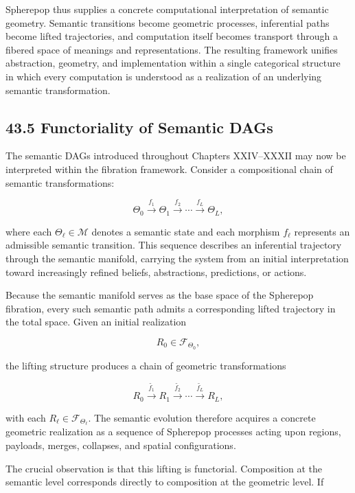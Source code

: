 \documentclass[12pt,letterpaper]{article}
\theoremstyle{remark}
\begin{document}
Spherepop thus supplies a concrete computational interpretation of semantic geometry. Semantic transitions become geometric processes, inferential paths become lifted trajectories, and computation itself becomes transport through a fibered space of meanings and representations. The resulting framework unifies abstraction, geometry, and implementation within a single categorical structure in which every computation is understood as a realization of an underlying semantic transformation.

\subsection{43.5 Functoriality of Semantic DAGs}

The semantic DAGs introduced throughout Chapters XXIV--XXXII may now be interpreted within the fibration framework. Consider a compositional chain of semantic transformations:

\[
\Theta_0
\xrightarrow{f_1}
\Theta_1
\xrightarrow{f_2}
\cdots
\xrightarrow{f_L}
\Theta_L,
\]

where each $\Theta_\ell \in \mathcal{M}$ denotes a semantic state and each morphism $f_\ell$ represents an admissible semantic transition. This sequence describes an inferential trajectory through the semantic manifold, carrying the system from an initial interpretation toward increasingly refined beliefs, abstractions, predictions, or actions.

Because the semantic manifold serves as the base space of the Spherepop fibration, every such semantic path admits a corresponding lifted trajectory in the total space. Given an initial realization

\[
R_0 \in \mathcal{F}_{\Theta_0},
\]

the lifting structure produces a chain of geometric transformations

\[
R_0
\xrightarrow{\widetilde{f_1}}
R_1
\xrightarrow{\widetilde{f_2}}
\cdots
\xrightarrow{\widetilde{f_L}}
R_L,
\]

with each $R_\ell \in \mathcal{F}_{\Theta_\ell}$. The semantic evolution therefore acquires a concrete geometric realization as a sequence of Spherepop processes acting upon regions, payloads, merges, collapses, and spatial configurations.

The crucial observation is that this lifting is functorial. Composition at the semantic level corresponds directly to composition at the geometric level. If
\end{document}
